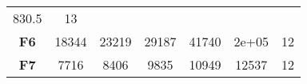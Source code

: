 \documentclass[12pt,a4paper]{article}
\begin{document}
\begin{longtable}[c]{@{}ccccccc@{}}
\begin{minipage}[t]{0.11\columnwidth}\centering\strut
830.5
\strut\end{minipage} &
\begin{minipage}[t]{0.07\columnwidth}\centering\strut
13
\strut\end{minipage}\tabularnewline
\begin{minipage}[t]{0.11\columnwidth}\centering\strut
\textbf{F6}
\strut\end{minipage} &
\begin{minipage}[t]{0.08\columnwidth}\centering\strut
18344
\strut\end{minipage} &
\begin{minipage}[t]{0.08\columnwidth}\centering\strut
23219
\strut\end{minipage} &
\begin{minipage}[t]{0.09\columnwidth}\centering\strut
29187
\strut\end{minipage} &
\begin{minipage}[t]{0.10\columnwidth}\centering\strut
41740
\strut\end{minipage} &
\begin{minipage}[t]{0.11\columnwidth}\centering\strut
2e+05
\strut\end{minipage} &
\begin{minipage}[t]{0.07\columnwidth}\centering\strut
12
\strut\end{minipage}\tabularnewline
\begin{minipage}[t]{0.11\columnwidth}\centering\strut
\textbf{F7}
\strut\end{minipage} &
\begin{minipage}[t]{0.08\columnwidth}\centering\strut
7716
\strut\end{minipage} &
\begin{minipage}[t]{0.08\columnwidth}\centering\strut
8406
\strut\end{minipage} &
\begin{minipage}[t]{0.09\columnwidth}\centering\strut
9835
\strut\end{minipage} &
\begin{minipage}[t]{0.10\columnwidth}\centering\strut
10949
\strut\end{minipage} &
\begin{minipage}[t]{0.11\columnwidth}\centering\strut
12537
\strut\end{minipage} &
\begin{minipage}[t]{0.07\columnwidth}\centering\strut
12
\strut\end{minipage}\tabularnewline

\end{longtable}
\end{document}
